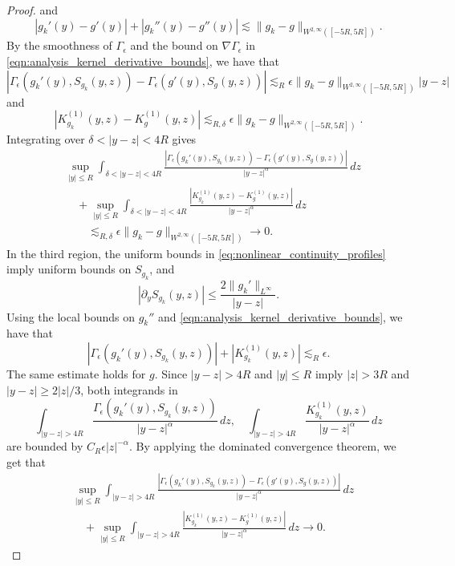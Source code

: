\documentclass[11pt]{amsart}
\theoremstyle{definition}
\theoremstyle{remark}
\numberwithin{equation}{section}
\begin{document}
\begin{proof}
    and
    \[|g_k'(y) - g'(y)| + |g_k''(y) - g''(y)| \lesssim \|g_k - g\|_{W^{2, \infty}([-5R,5R])}.\]
    By the smoothness of $\Gamma_\epsilon$ and the bound on $\nabla \Gamma_\epsilon$ in \eqref{eqn:analysis_kernel_derivative_bounds}, we have that
    \[|\Gamma_\epsilon(g_k'(y), S_{g_k}(y, z)) - \Gamma_\epsilon(g'(y), S_g(y, z))| \lesssim_R \epsilon\|g_k - g\|_{W^{2, \infty}([-5R,5R])}|y-z|\]
    and 
    \[|K_{g_k}^{(1)}(y,z)-K_g^{(1)}(y,z)| \lesssim_{R,\delta}\epsilon\|g_k-g\|_{W^{2,\infty}([-5R,5R])}.\]
    Integrating over $\delta<|y-z|<4R$ gives
    \begin{equation}\label{eq:nonlinear_continuity_middle}
    \begin{aligned}
        &\mathop{\sup}_{|y|\le R}\int_{\delta<|y-z|<4R}
        \frac{|\Gamma_\epsilon(g_k'(y),S_{g_k}(y,z))-\Gamma_\epsilon(g'(y),S_g(y,z))|}{|y-z|^\alpha}\,dz\\
        &\quad+\mathop{\sup}_{|y|\le R}\int_{\delta<|y-z|<4R}
        \frac{|K_{g_k}^{(1)}(y,z)-K_g^{(1)}(y,z)|}{|y-z|^\alpha}\,dz\\
        &\qquad\lesssim_{R,\delta}\epsilon\|g_k-g\|_{W^{2,\infty}([-5R,5R])}\to0.
    \end{aligned}
    \end{equation}
    In the third region, the uniform bounds in \eqref{eq:nonlinear_continuity_profiles} imply uniform bounds on $S_{g_k}$, and
    \[|\partial_yS_{g_k}(y,z)|\le\frac{2\|g_k'\|_{L^\infty}}{|y-z|}.\]
    Using the local bounds on $g_k''$ and \eqref{eqn:analysis_kernel_derivative_bounds}, we have that
    \[|\Gamma_\epsilon(g_k'(y),S_{g_k}(y,z))|+|K_{g_k}^{(1)}(y,z)|\lesssim_R\epsilon.\]
    The same estimate holds for $g$. Since $|y-z|>4R$ and $|y|\le R$ imply $|z|>3R$ and $|y-z|\ge 2|z|/3$, both integrands in 
    \[\int_{|y - z| > 4R}\frac{\Gamma_\epsilon(g_k'(y),S_{g_k}(y,z))}{|y-z|^\alpha}\,dz, \quad \int_{|y - z| > 4R}\frac{K_{g_k}^{(1)}(y,z)}{|y-z|^\alpha}\,dz\]
    are bounded by $C_R\epsilon|z|^{-\alpha}$. By applying the dominated convergence theorem, we get that
    \begin{equation}\label{eq:nonlinear_continuity_far}
    \begin{aligned}
        &\mathop{\sup}_{|y|\le R}\int_{|y-z|>4R}
        \frac{|\Gamma_\epsilon(g_k'(y),S_{g_k}(y,z))-\Gamma_\epsilon(g'(y),S_g(y,z))|}{|y-z|^\alpha}\,dz\\
        &\quad+\mathop{\sup}_{|y|\le R}\int_{|y-z|>4R}
        \frac{|K_{g_k}^{(1)}(y,z)-K_g^{(1)}(y,z)|}{|y-z|^\alpha}\,dz\to0.
    \end{aligned}

\end{equation}
\end{proof}
\end{document}

